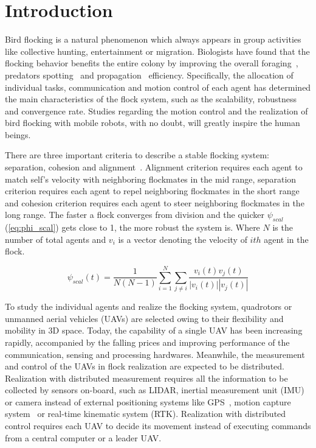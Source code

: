 \chapter{Introduction}\label{introduction}

Bird flocking is a natural phenomenon which always appears in group activities like collective hunting, entertainment or migration. Biologists have found that the flocking behavior benefits the entire colony by improving the overall foraging~\cite{Foraging}, predators spotting~\cite{Predator} and propagation~\cite{Propagation} efficiency. Specifically, the allocation of individual tasks, communication and motion control of each agent has determined the main characteristics of the flock system, such as the scalability, robustness and convergence rate. Studies regarding the motion control and the realization of bird flocking with mobile robots, with no doubt, will greatly inspire the human beings.

There are three important criteria to describe a stable flocking system: separation, cohesion and alignment~\cite{Reynolds1987}. Alignment criterion requires each agent to match self's velocity with neighboring flockmates in the mid range, separation criterion requires each agent to repel neighboring flockmates in the short range and cohesion criterion requires each agent to steer neighboring flockmates in the long range. The faster a flock converges from division and the quicker $\psi_{scal}$ (\ref{eq:phi_scal}) gets close to 1, the more robust the system is. Where $N$ is the number of total agents and $v_i$ is a vector denoting the velocity of $ith$ agent in the flock.

\begin{equation}\label{eq:psi_scal}
\psi_{scal}(t)=\frac{1}{N(N-1)}\sum^N_{i=1}\sum_{j\neq i}\frac{v_i(t)v_j(t)}{|v_i(t)||v_j(t)|}
\end{equation}

To study the individual agents and realize the flocking system, quadrotors or unmanned aerial vehicles (UAVs) are selected owing to their flexibility and mobility in 3D space. Today, the capability of a single UAV has been increasing rapidly, accompanied by the falling prices and improving performance of the communication, sensing and processing hardwares. Meanwhile, the measurement and control of the UAVs in flock realization are expected to be distributed. Realization with distributed measurement requires all the information to be collected by sensors on-board, such as LIDAR, inertial measurement unit (IMU) or camera instead of external positioning systems like GPS~\cite{Vicsek2018}, motion capture system~\cite{Swarm2018} or real-time kinematic system (RTK). Realization with distributed control requires each UAV to decide its movement instead of executing commands from a central computer or a leader UAV.

